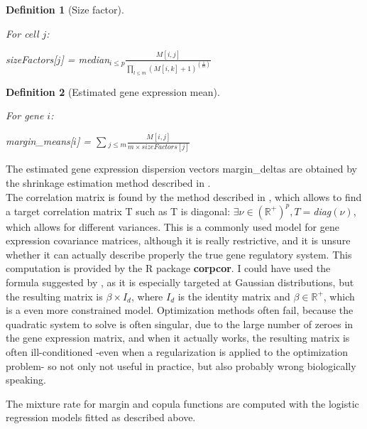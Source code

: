 \documentclass{report}
\newtheorem{definition}{Definition}[section]
\begin{document}
{\begin{definition}[Size factor]\label{sizefactor}{For cell $j$:\begin{center}sizeFactors[$j$] = \textit{median}$_{i \leq p} \frac{M[i, j]}{\prod_{l \leq m} (M[i, k]+1)^{(\frac{1}{m})}}$\end{center}}\end{definition}

\begin{definition}[Estimated gene expression mean]\label{marginmean}{For gene $i$:\begin{center}margin\_means[$i$] = $\sum{_{j \leq m} \frac{M[i, j]}{m \times sizeFactors[j]}}$\end{center}}\end{definition}

The estimated gene expression dispersion vectors margin\_deltas are obtained by the shrinkage estimation method described in \cite{yu2013shrinkage}.\\

The correlation matrix is found by the method described in \cite{schafer2005shrinkage}, which allows to find a target correlation matrix T such as T is diagonal: $\exists \nu \in (\mathbb{R}^{+})^{p}, T = $\textit{diag}$(\nu)$, which allows for different variances. This is a commonly used model for gene expression covariance matrices, although it is really restrictive, and it is unsure whether it can actually describe properly the true gene regulatory system. This computation is provided by the R package \textbf{corpcor}. I could have used the formula suggested by \cite{chen2009shrinkage}, as it is especially targeted at Gaussian distributions, but the resulting matrix is $\beta \times I_d$, where $I_d$ is the identity matrix and $\beta \in \mathbb{R}^{+}$, which is a even more constrained model. Optimization methods often fail, because the quadratic system to solve is often singular, due to the large number of zeroes in the gene expression matrix, and when it actually works, the resulting matrix is often ill-conditioned -even when a regularization is applied to the optimization problem- so not only not useful in practice, but also probably wrong biologically speaking.


The mixture rate for margin and copula functions are computed with the logistic regression models fitted as described above.

}
\end{document}
